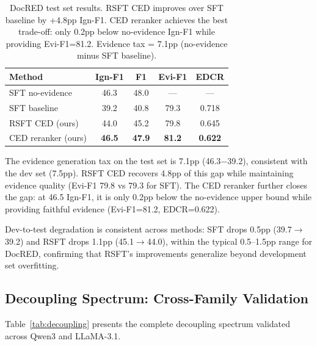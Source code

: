 \documentclass[11pt]{article}
\begin{document}
\begin{table}[t]
\centering
\small
\begin{tabular}{lcccc}
\toprule
\textbf{Method} & \textbf{Ign-F1} & \textbf{F1} & \textbf{Evi-F1} & \textbf{EDCR} \\
\midrule
SFT no-evidence & 46.3 & 48.0 & --- & --- \\
SFT baseline & 39.2 & 40.8 & 79.3 & 0.718 \\
RSFT CED (ours) & 44.0 & 45.2 & 79.8 & 0.645 \\
CED reranker (ours) & \textbf{46.5} & \textbf{47.9} & \textbf{81.2} & \textbf{0.622} \\
\bottomrule
\end{tabular}
\caption{DocRED test set results. RSFT CED improves over SFT baseline by +4.8pp Ign-F1. CED reranker achieves the best trade-off: only 0.2pp below no-evidence Ign-F1 while providing Evi-F1=81.2. Evidence tax = 7.1pp (no-evidence minus SFT baseline).}
\label{tab:test}
\end{table}

The evidence generation tax on the test set is 7.1pp (46.3$-$39.2), consistent with the dev set (7.5pp). RSFT CED recovers 4.8pp of this gap while maintaining evidence quality (Evi-F1 79.8 vs 79.3 for SFT). The CED reranker further closes the gap: at 46.5 Ign-F1, it is only 0.2pp below the no-evidence upper bound while providing faithful evidence (Evi-F1=81.2, EDCR=0.622).

Dev-to-test degradation is consistent across methods: SFT drops 0.5pp (39.7$\to$39.2) and RSFT drops 1.1pp (45.1$\to$44.0), within the typical 0.5--1.5pp range for DocRED, confirming that RSFT's improvements generalize beyond development set overfitting.

\subsection{Decoupling Spectrum: Cross-Family Validation}

Table~\ref{tab:decoupling} presents the complete decoupling spectrum validated across Qwen3 and LLaMA-3.1.
\end{document}
